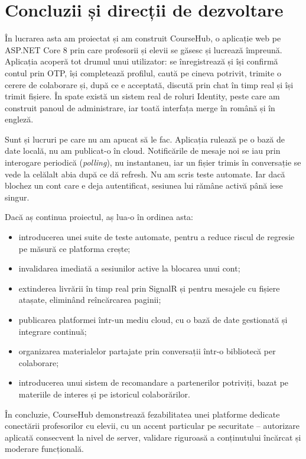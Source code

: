 \chapter{Concluzii și direcții de dezvoltare}

În lucrarea asta am proiectat și am construit CourseHub, o aplicație web pe
ASP.NET Core 8 prin care profesorii și elevii se găsesc și lucrează împreună.
Aplicația acoperă tot drumul unui utilizator: se înregistrează și își confirmă
contul prin OTP, își completează profilul, caută pe cineva potrivit, trimite o
cerere de colaborare și, după ce e acceptată, discută prin chat în timp real și
își trimit fișiere. În spate există un sistem real de roluri Identity, peste care
am construit panoul de administrare, iar toată interfața merge în română și în
engleză.

Sunt și lucruri pe care nu am apucat să le fac. Aplicația rulează pe o bază de
date locală, nu am publicat-o în cloud. Notificările de mesaje noi se iau prin
interogare periodică (\emph{polling}), nu instantaneu, iar un fișier trimis în
conversație se vede la celălalt abia după ce dă refresh. Nu am scris teste
automate. Iar dacă blochez un cont care e deja autentificat, sesiunea lui rămâne
activă până iese singur.

Dacă aș continua proiectul, aș lua-o în ordinea asta:

\begin{itemize}
    \item introducerea unei suite de teste automate, pentru a reduce riscul de
    regresie pe măsură ce platforma crește;
    \item invalidarea imediată a sesiunilor active la blocarea unui cont;
    \item extinderea livrării în timp real prin SignalR și pentru mesajele cu
    fișiere atașate, eliminând reîncărcarea paginii;
    \item publicarea platformei într-un mediu cloud, cu o bază de date gestionată
    și integrare continuă;
    \item organizarea materialelor partajate prin conversații într-o bibliotecă
    per colaborare;
    \item introducerea unui sistem de recomandare a partenerilor potriviți, bazat
    pe materiile de interes și pe istoricul colaborărilor.
\end{itemize}

În concluzie, CourseHub demonstrează fezabilitatea unei platforme dedicate
conectării profesorilor cu elevii, cu un accent particular pe securitate --
autorizare aplicată consecvent la nivel de server, validare riguroasă a
conținutului încărcat și moderare funcțională.
